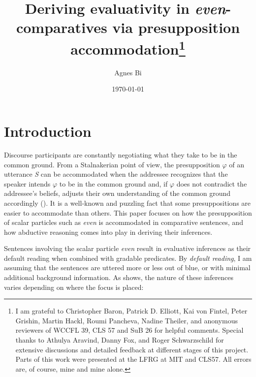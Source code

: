 \documentclass[12pt,letterpaper]{scrartcl}
\title{\LARGE Deriving evaluativity in \textit{even}-comparatives via presupposition accommodation\thanks{I am grateful to Christopher Baron, Patrick D. Elliott, Kai von Fintel, Peter Grishin, Martin Hackl, Roumi Pancheva, Nadine Theiler, and anonymous reviewers of WCCFL 39, CLS 57 and SuB 26 for helpful comments. Special thanks to Athulya Aravind, Danny Fox, and Roger Schwarzschild for extensive discussions and detailed feedback at different stages of this project. Parts of this work were presented at the LFRG at MIT and CLS57. All errors are, of course, mine and mine alone.}}
\author{\large Agnes Bi}
\date{\large \today}
\begin{document}

\setlength{\Exlabelsep}{0.6em}  %
\setlength{\SubExleftmargin}{1.6em}  %


\setlength{\abovedisplayskip}{0pt}
\setlength{\belowdisplayskip}{0pt}
\setlength{\abovedisplayshortskip}{0pt}
\setlength{\belowdisplayshortskip}{0pt}

\singlespacing

\maketitle

\section{Introduction}

Discourse participants are constantly negotiating what they take to be in the common ground. From a Stalnakerian point of view, the presupposition $\varphi$ of an utterance \textit{S} can be accommodated when the addressee recognizes that the speaker intends $\varphi$ to be in the common ground and, if $\varphi$ does not contradict the addressee's beliefs, adjusts their own understanding of the common ground accordingly (\cite{stalnaker_common_2002}). It is a well-known and puzzling fact that some presuppositions are easier to accommodate than others. This paper focuses on how the presupposition of scalar particles such as \textit{even} is accommodated in comparative sentences, and how abductive reasoning comes into play in deriving their inferences.

Sentences involving the scalar particle \textit{even} result in evaluative inferences as their default reading when combined with gradable predicates. By \textit{default reading}, I am assuming that the sentences are uttered more or less out of blue, or with minimal additional background information. As \Next shows, the nature of these inferences varies depending on where the focus is placed:
\end{document}
